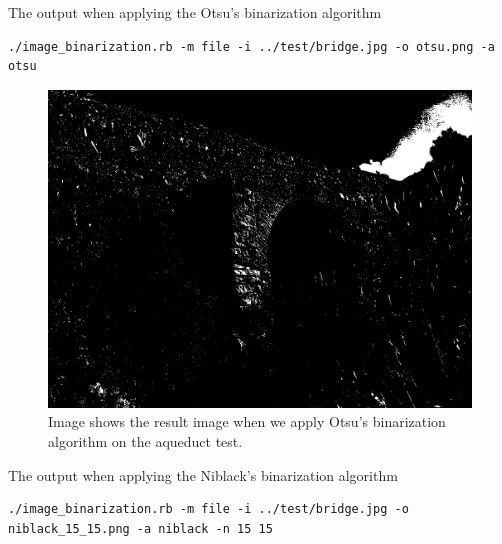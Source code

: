 \documentclass[a4paper,10pt,titlepage]{article}
\begin{document}
\par The output when applying the Otsu's binarization algorithm
{\footnotesize\begin{verbatim}
./image_binarization.rb -m file -i ../test/bridge.jpg -o otsu.png -a otsu
\end{verbatim}}

\par \begin{figure}[H]
	\centerline{%
	\includegraphics[scale=0.3]{./images/otsu.png}
	}
	\caption[Otsu's binarization sample]{Image shows the result image when we apply Otsu's binarization algorithm on the aqueduct 
test.}
\end{figure}

\par The output when applying the Niblack's binarization algorithm
{\footnotesize\begin{verbatim}
./image_binarization.rb -m file -i ../test/bridge.jpg -o niblack_15_15.png -a niblack -n 15 15
\end{verbatim}}	
\end{document}
